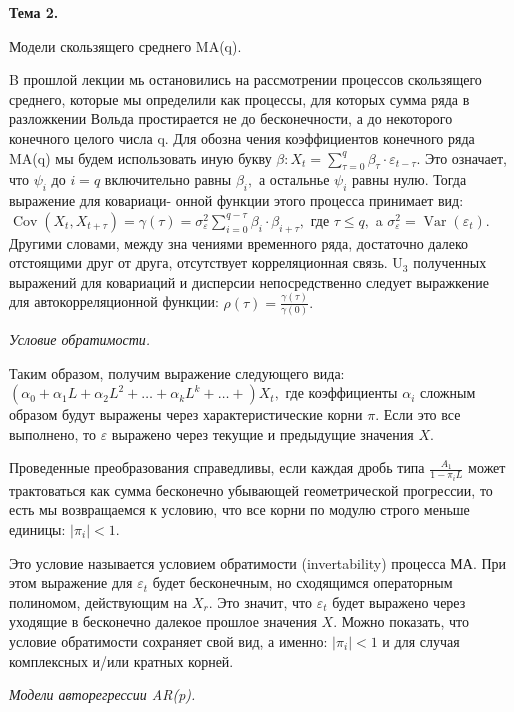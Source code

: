 \documentclass[a4paper,8pt]{article} %
\begin{document}
\textbf{Тема 2.}

Модели  скользящего  среднего MA(q).  

B прошлой лекции мь остановились на рассмотрении процессов скользящего среднего, которые мы определили как процессы, для которых сумма ряда в разложкении Вольда простирается не до бесконечности, а до некоторого конечного целого числа q. Для обозна чения коэффициентов конечного ряда MA(q) мы будем
использовать иную букву $\beta: X_{t}=\sum_{\tau=0}^{q} \beta_{\tau} \cdot \varepsilon_{t-\tau} .$ Это означает, что $\psi_{i}$ до $i=q$ включительно равны $\beta_{i},$ а остальнье $\psi_{i}$ равны нулю. Тогда выражение для ковариаци-
онной функции этого процесса принимает вид: $\operatorname{Cov}\left(X_{t}, X_{t+\tau}\right)=\gamma(\tau)=\sigma_{\varepsilon}^{2} \sum_{i=0}^{q-\tau} \beta_{i} \cdot \beta_{i+\tau},$
где $\tau \leq q,$ a $\sigma_{\varepsilon}^{2}=\operatorname{Var}\left(\varepsilon_{t}\right) .$ Другими словами, между зна чениями временного ряда, достаточно далеко отстоящими друг от друга, отсутствует корреляционная связь. $\mathrm{U}_{3}$ полученных выражений для ковариаций и дисперсии непосредственно следует выражкение для автокорреляционной функции: $\rho(\tau)=\frac{\gamma(\tau)}{\gamma(0)} .$


\textit{Условие  обратимости. }

Таким образом, получим выражение следующего вида: $\left(\alpha_{0}+\alpha_{1} L+\alpha_{2} L^{2}+\ldots+\alpha_{k} L^{k}+\ldots+\right) X_{t},$ где коэффициенты
$\alpha_{i}$ сложным образом будут выражены через характеристические корни $\pi .$ Если
это все выполнено, то $\varepsilon$ выражено через текущие и предыдущие значения $X$.

Проведенные преобразования справедливы, если каждая дробь типа $\frac{A_{1}}{1-\pi_{i} L}$ может трактоваться как сумма бесконечно убывающей геометрической прогрессии, то есть мы возвращаемся к условию, что все корни по модулю строго меньше единицы: $\left|\pi_{i}\right|<1$.

Это условие называется условием обратимости (invertability) процесса МА. При этом выражение для $\varepsilon_{t}$ будет бесконечным, но сходящимся операторным
полиномом, действующим на $X_{r} .$ Это значит, что $\varepsilon_{t}$ будет выражено через уходящие в бесконечно далекое прошлое значения $X .$ Можно показать, что условие обратимости сохраняет свой вид, а именно: $\left|\pi_{i}\right|<1$ и для случая комплексных и/или кратных корней.

\textit{Модели  авторегрессии AR(p).  }
\end{document}
